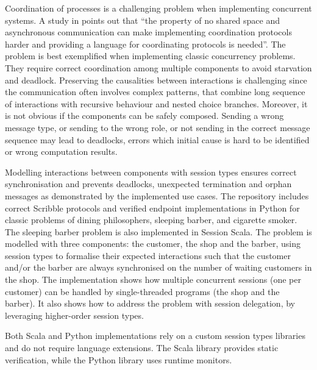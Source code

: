 Coordination of processes is a challenging problem
when implementing concurrent systems.
A study in \cite{ActorCoordinationStudy} points out that
``the property of no shared space and asynchronous communication
can make implementing coordination protocols harder and
providing a language for coordinating protocols is needed''.
The problem is best exemplified when implementing
classic concurrency problems. They require correct coordination
among multiple components to avoid starvation and deadlock.
Preserving the causalities between interactions is
challenging since the communication often involves complex patterns,
that combine long sequence of interactions with recursive behaviour
and nested choice branches. Moreover, it is not obvious if the components can be safely composed.
Sending a wrong message type, or sending to the wrong role,
or not sending in the correct message sequence may lead to deadlocks,
errors which initial cause is hard to be identified or wrong computation results.


Modelling interactions between components with session types ensures
correct synchronisation and prevents deadlocks,
unexpected termination and orphan messages as demonstrated by the implemented use cases. The repository includes correct Scribble protocols and verified endpoint implementations in Python for classic problems of dining philosophers, sleeping barber, and
cigarette smoker. The sleeping barber problem is also implemented in Session Scala. The problem is modelled with three components: the customer, the shop and the barber, using session types to formalise their expected interactions such that the customer and/or the barber are always synchronised on the number of waiting customers in the shop. The implementation shows how multiple concurrent sessions (one per customer) can be handled by single-threaded programs (the shop and the barber). It also shows how to address the problem with session delegation, by leveraging higher-order session types. 

Both Scala and Python implementations rely on a custom session types libraries and do not require language extensions. The Scala library provides static verification, while the Python library uses runtime monitors.  


